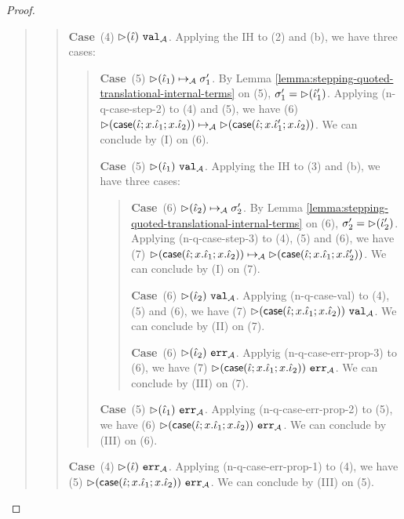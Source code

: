 \documentclass[12pt]{article}
\newcommand{\pfcase}[1]{\textbf{Case}~#1. }
\begin{document}
\begin{proof}
\begin{quote}
\begin{quote}
        \pfcase{(4) ${\rhd}(\hat{\iota})~\mathtt{val}_{\mathcal{A}}$} Applying the IH to (2) and (b), we have three cases:

        \begin{quote}
            \pfcase{(5) ${\rhd}(\hat{\iota}_1) \mapsto_{\mathcal{A}} \sigma_1'$} By Lemma \ref{lemma:stepping-quoted-translational-internal-terms} on (5), $\sigma_1'={\rhd}(\hat{\iota}_1')$. Applying (n-q-case-step-2) to (4) and (5), we have (6) ${\rhd}({\sf case}(\hat{\iota}; x.\hat{\iota}_1; x.\hat{\iota}_2)) \mapsto_{\mathcal{A}} {\rhd}({\sf case}(\hat{\iota}; x.\hat{\iota}_1'; x.\hat{\iota}_2))$. We can conclude by (I) on (6).

            \pfcase{(5) ${\rhd}(\hat{\iota}_1)~\mathtt{val}_{\mathcal{A}}$} Applying the IH to (3) and (b), we have three cases:

            \begin{quote}
                \pfcase{(6) ${\rhd}(\hat{\iota}_2) \mapsto_{\mathcal{A}} \sigma_2'$} By Lemma \ref{lemma:stepping-quoted-translational-internal-terms} on (6), $\sigma_2'={\rhd}(\hat{\iota}_2')$. Applying (n-q-case-step-3) to (4), (5) and (6), we have (7) ${\rhd}({\sf case}(\hat{\iota}; x.\hat{\iota}_1; x.\hat{\iota}_2)) \mapsto_{\mathcal{A}} {\rhd}({\sf case}(\hat{\iota}; x.\hat{\iota}_1; x.\hat{\iota}_2'))$. We can conclude by (I) on (7).

                \pfcase{(6) ${\rhd}(\hat{\iota}_2)~\mathtt{val}_{\mathcal{A}}$} Applying (n-q-case-val) to (4), (5) and (6), we have (7) ${\rhd}({\sf case}(\hat{\iota}; x.\hat{\iota}_1; x.\hat{\iota}_2))~\mathtt{val}_{\mathcal{A}}$. We can conclude by (II) on (7).

                \pfcase{(6) ${\rhd}(\hat{\iota}_2)~\mathtt{err}_{\mathcal{A}}$} Applyig (n-q-case-err-prop-3) to (6), we have (7) ${\rhd}({\sf case}(\hat{\iota}; x.\hat{\iota}_1; x.\hat{\iota}_2))~\mathtt{err}_{\mathcal{A}}$. We can conclude by (III) on (7).
            \end{quote}

            \pfcase{(5) ${\rhd}(\hat{\iota}_1)~\mathtt{err}_{\mathcal{A}}$} Applying (n-q-case-err-prop-2) to (5), we have (6) ${\rhd}({\sf case}(\hat{\iota}; x.\hat{\iota}_1; x.\hat{\iota}_2))~\mathtt{err}_{\mathcal{A}}$. We can conclude by (III) on (6).
        \end{quote}

        \pfcase{(4) ${\rhd}(\hat{\iota})~\mathtt{err}_{\mathcal{A}}$} Applying (n-q-case-err-prop-1) to (4), we have (5) ${\rhd}({\sf case}(\hat{\iota}; x.\hat{\iota}_1; x.\hat{\iota}_2))~\mathtt{err}_{\mathcal{A}}$. We can conclude by (III) on (5).
    \end{quote}

\end{quote}



\end{proof}
\end{document}
